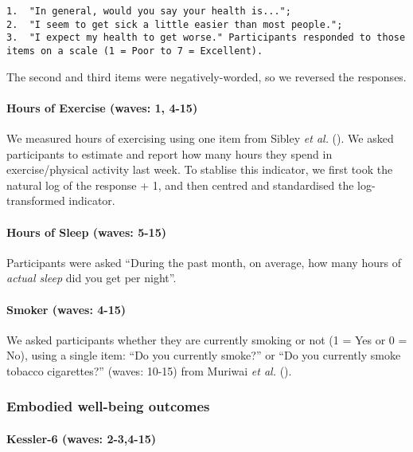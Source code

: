 \documentclass[
  singlecolumn,
  9pt]{article}
\let\oldparagraph\paragraph
\renewcommand{\paragraph}[1]{\oldparagraph{#1}\mbox{}}
\begin{document}
\begin{verbatim}
1.  "In general, would you say your health is...";
2.  "I seem to get sick a little easier than most people.";
3.  "I expect my health to get worse." Participants responded to those items on a scale (1 = Poor to 7 = Excellent).
\end{verbatim}

The second and third items were negatively-worded, so we reversed the
responses.

\paragraph{Hours of Exercise (waves: 1,
4-15)}\label{hours-of-exercise-waves-1-4-15}

We measured hours of exercising using one item from Sibley \emph{et al.}
(). We asked participants to estimate and
report how many hours they spend in exercise/physical activity last
week. To stablise this indicator, we first took the natural log of the
response + 1, and then centred and standardised the log-transformed
indicator.

\paragraph{Hours of Sleep (waves:
5-15)}\label{hours-of-sleep-waves-5-15}

Participants were asked ``During the past month, on average, how many
hours of \emph{actual sleep} did you get per night''.

\paragraph{Smoker (waves: 4-15)}\label{smoker-waves-4-15}

We asked participants whether they are currently smoking or not (1 = Yes
or 0 = No), using a single item: ``Do you currently smoke?'' or ``Do you
currently smoke tobacco cigarettes?'' (waves: 10-15) from Muriwai
\emph{et al.} ().

\subsubsection{Embodied well-being
outcomes}\label{embodied-well-being-outcomes}

\paragraph{Kessler-6 (waves: 2-3,4-15)}\label{kessler-6-waves-2-34-15}
\end{document}
